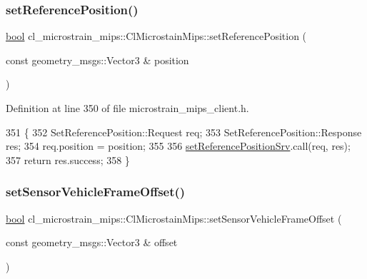 \subsubsection{\texorpdfstring{set\+Reference\+Position()}{setReferencePosition()}}
{\footnotesize\ttfamily \hyperlink{classbool}{bool} cl\+\_\+microstrain\+\_\+mips\+::\+Cl\+Microstain\+Mips\+::set\+Reference\+Position (\begin{DoxyParamCaption}\item[{const geometry\+\_\+msgs\+::\+Vector3 \&}]{position }\end{DoxyParamCaption})\hspace{0.3cm}{\ttfamily [inline]}}



Definition at line 350 of file microstrain\+\_\+mips\+\_\+client.\+h.


\begin{DoxyCode}
351     \{
352         SetReferencePosition::Request req;
353         SetReferencePosition::Response res;
354         req.position = position;
355 
356         \hyperlink{classcl__microstrain__mips_1_1ClMicrostainMips_a778117029f93a6cff9c5e2a0dac9742b}{setReferencePositionSrv}.call(req, res);
357         \textcolor{keywordflow}{return} res.success;
358     \}
\end{DoxyCode}
\mbox{\label{classcl__microstrain__mips_1_1ClMicrostainMips_a2b2786c142088f7d8e0fba6fc67d3a88}} 
\subsubsection{\texorpdfstring{set\+Sensor\+Vehicle\+Frame\+Offset()}{setSensorVehicleFrameOffset()}}
{\footnotesize\ttfamily \hyperlink{classbool}{bool} cl\+\_\+microstrain\+\_\+mips\+::\+Cl\+Microstain\+Mips\+::set\+Sensor\+Vehicle\+Frame\+Offset (\begin{DoxyParamCaption}\item[{const geometry\+\_\+msgs\+::\+Vector3 \&}]{offset }\end{DoxyParamCaption})\hspace{0.3cm}{\ttfamily [inline]}}



